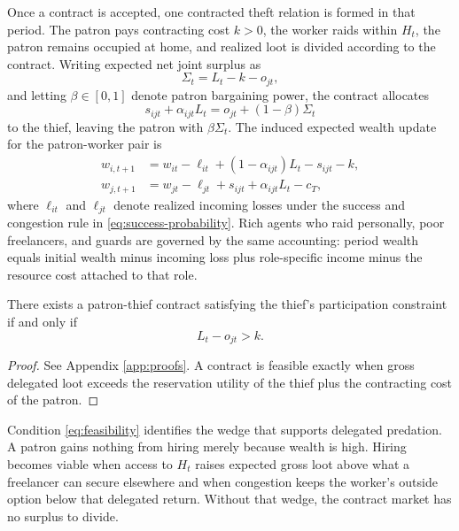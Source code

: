 Once a contract is accepted, one contracted theft relation is formed in that period. The patron pays contracting cost $k>0$, the worker raids within $H_t$, the patron remains occupied at home, and realized loot is divided according to the contract. Writing expected net joint surplus as
\begin{equation}
\Sigma_t = L_t - k - o_{jt},
\label{eq:total-surplus}
\end{equation}
and letting $\beta \in [0,1]$ denote patron bargaining power, the contract allocates
\begin{equation}
s_{ijt} + \alpha_{ijt}L_t = o_{jt} + (1-\beta)\Sigma_t
\label{eq:bargaining-rule}
\end{equation}
to the thief, leaving the patron with $\beta\Sigma_t$. The induced expected wealth update for the patron-worker pair is
\begin{equation}
\begin{aligned}
w_{i,t+1} &= w_{it} - \ell_{it} + (1-\alpha_{ijt})L_t - s_{ijt} - k,\\
w_{j,t+1} &= w_{jt} - \ell_{jt} + s_{ijt} + \alpha_{ijt}L_t - c_T,
\end{aligned}
\label{eq:contract-update}
\end{equation}
where $\ell_{it}$ and $\ell_{jt}$ denote realized incoming losses under the success and congestion rule in \eqref{eq:success-probability}. Rich agents who raid personally, poor freelancers, and guards are governed by the same accounting: period wealth equals initial wealth minus incoming loss plus role-specific income minus the resource cost attached to that role.

\begin{lemma}
\label{lem:contract-feasibility}
There exists a patron-thief contract satisfying the thief's participation constraint if and only if
\begin{equation}
L_t - o_{jt} > k.
\label{eq:feasibility}
\end{equation}
\end{lemma}

\begin{proof}
See Appendix \ref{app:proofs}. A contract is feasible exactly when gross delegated loot exceeds the reservation utility of the thief plus the contracting cost of the patron.
\end{proof}

Condition \eqref{eq:feasibility} identifies the wedge that supports delegated predation. A patron gains nothing from hiring merely because wealth is high. Hiring becomes viable when access to $H_t$ raises expected gross loot above what a freelancer can secure elsewhere and when congestion keeps the worker's outside option below that delegated return. Without that wedge, the contract market has no surplus to divide.

